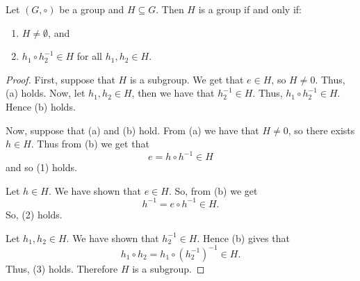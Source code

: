 \documentclass[12pt]{article}
\begin{document}
\begin{theorem}
    Let \((G, \circ)\) be a group and \(H\subseteq G\). Then \(H\) is a group if and only if:
    \begin{enumerate}[label=\alph*)]
        \item \(H\neq \emptyset\), and
        \item \(h_1 \circ h_2^{-1}\in H\) for all \(h_1, h_2\in H\).
    \end{enumerate}
\end{theorem}
\begin{proof}
    First, suppose that \(H\) is a subgroup. We get that \(e\in H\), so \(H\neq 0\). Thus, (a) holds. Now, let \(h_1, h_2\in H\), then we have that \(h_2^{-1}\in H\). Thus, \(h_1\circ h_2^{-1}\in H\). Hence (b) holds. 

    Now, suppose that (a) and (b) hold. From (a) we have that \(H\neq 0\), so there exists \(h\in H\). Thus from (b) we get that 
    \begin{equation*}
        e = h\circ h^{-1}\in H
    \end{equation*}
    and so (1) holds. 

    Let \(h\in H\). We have shown that \(e\in H\). So, from (b) we get
    \begin{equation*}
        h^{-1} = e \circ h^{-1} \in H.
    \end{equation*}
    So, (2) holds.
    
    Let \(h_1, h_2\in H\). We have shown that \(h_2^{-1}\in H\). Hence (b) gives that
    \begin{equation*}
        h_1\circ h_2= h_1\circ (h_2^{-1})^{-1} \in H.
    \end{equation*}
    Thus, (3) holds. Therefore \(H\) is a subgroup. 
\end{proof}
\end{document}
